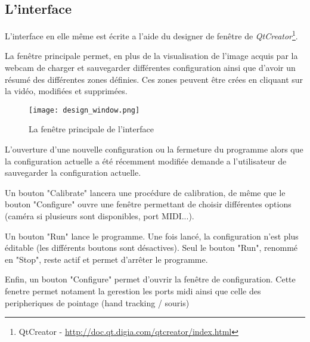 \subsection{L'interface}
\par L'interface en elle même est écrite a l'aide du designer de fenêtre de \emph{QtCreator}\footnote{QtCreator - \url{http://doc.qt.digia.com/qtcreator/index.html}}.
\par La fenêtre principale permet, en plus de la visualisation de l'image acquis par la webcam de charger et sauvegarder différentes configuration ainsi que d'avoir un résumé des différentes zones définies. Ces zones peuvent être crées en cliquant sur la vidéo, modifiées et supprimées.
\begin{figure}
    \centering
    \texttt{[image: design\_window.png]}
    \caption{La fenêtre principale de l'interface}
\end{figure}
\par L'ouverture d'une nouvelle configuration ou la fermeture du programme alors que la configuration actuelle a été récemment modifiée demande a l'utilisateur de sauvegarder la configuration actuelle.
\par Un bouton "Calibrate" lancera une procédure de calibration, de même que le bouton "Configure" ouvre une fenêtre permettant de choisir différentes options (caméra si plusieurs sont disponibles, port MIDI...).
\par Un bouton "Run" lance le programme. Une fois lancé, la configuration n'est plus éditable (les différents boutons sont désactives). Seul le bouton "Run", renommé en "Stop", reste actif et permet d'arrêter le programme.
\par Enfin, un bouton "Configure" permet d'ouvrir la fenêtre de configuration. Cette fenetre permet notament la gerestion les ports midi ainsi que celle des peripheriques de pointage (hand tracking / souris)
